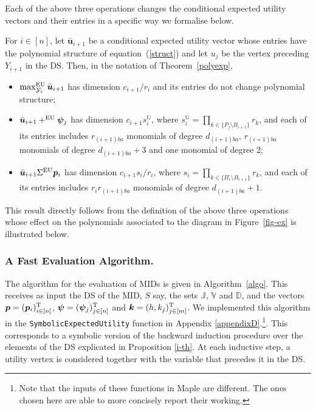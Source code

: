 Each of the above three operations changes the conditional expected utility vectors and their entries in a specific way we formalise below.

\begin{proposition}
\label{polyop}
For $i\in [n]$, let $\bar{\bm{u}}_{i+1}$ be a conditional expected utility vector whose entries have the polynomial structure of equation~(\ref{struct}) and let $u_j$ be the vertex preceding $Y_{i+1}$ in the DS. Then, in the notation of Theorem~\ref{polyexp},
\begin{itemize}
\item $\max^{\textnormal{EU}}_{\mathcal{Y}_i}\bar{\bm{u}}_{i+1}$ has dimension $c_{i+1}/r_i$ and its entries  do not change polynomial structure;
\item $\bar{\bm{u}}_{i+1} +^{\textnormal{EU}} \bm{\psi}_{j}$ has dimension $c_{i+1}s_{i}^\mathbb{U}$, where $s_i^\mathbb{U}=\prod_{k\in \{P_j\setminus B_{i+1}\}}r_k$, and each of its entries includes $r_{(i+1)ba}$ monomials of degree $d_{(i+1)ba}$, $r_{(i+1)ba}$ monomials of degree $d_{(i+1)ba}+3$ and one monomial of degree 2;
\item $\bar{\bm{u}}_{i+1}\Sigma^{\textnormal{EU}}\bm{p}_i$ has dimension $c_{i+1}s_i/r_i$, where $s_i=\prod_{k\in \{\Pi_i\setminus B_{i+1}\}}r_k$, and each of its entries includes $r_ir_{(i+1)ba}$ monomials of degree $d_{(i+1)ba}+1$.
\end{itemize} 
\end{proposition}
This result directly follows from the definition of the above three operations whose effect on the polynomials associated to the diagram in Figure~\ref{fig-ex} is illustrated below.

\subsubsection{A Fast Evaluation Algorithm.} \label{alg}
The algorithm for the evaluation of MIDs is given in Algorithm~\ref{algo}. This receives as input the DS of the MID, $S$ say, the sets $\mathbb{J}$, $\mathbb{V}$ and $\mathbb{D}$, and the vectors $\bm{p}=(\bm{p}_i)_{i\in[n]}^{\textnormal{T}}$, $\bm{\psi}=(\bm{\psi}_j)_{j\in[n]}^{\textnormal{T}}$ and $\bm{k}=(h,k_j)_{j\in[m]}^{\textnormal{T}}$. We implemented this algorithm in the \texttt{SymbolicExpectedUtility} function in Appendix \ref{appendixD}.\footnote{Note that the inputs of these functions in Maple are different. The ones chosen here are able to more concisely report their working.}.  This corresponds to a symbolic version of the backward induction procedure over the elements of the DS explicated in Proposition \ref{i-th}. At each  inductive step, a utility vertex is considered together with the variable that precedes it in the DS.

